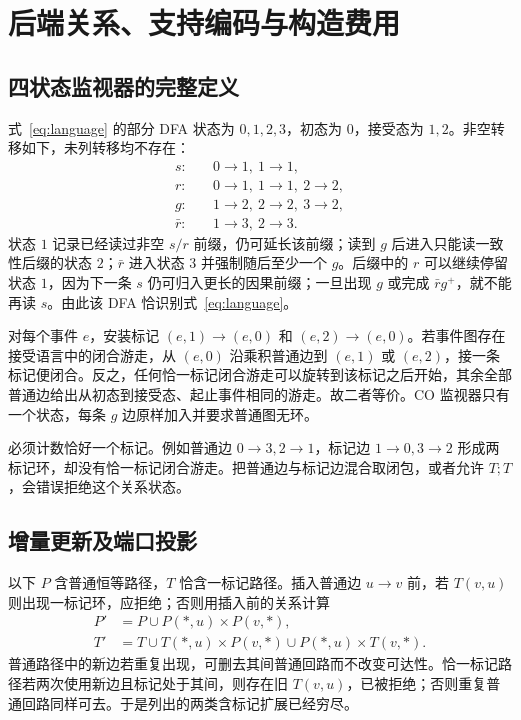 \section{后端关系、支持编码与构造费用}
\subsection{四状态监视器的完整定义}\label{app:automaton}
式~\eqref{eq:language} 的部分 DFA 状态为 $0,1,2,3$，初态为 $0$，接受态为 $1,2$。非空转移如下，未列转移均不存在：
\begin{align*}
 s:&\quad 0\to1,\ 1\to1,\\
 r:&\quad 0\to1,\ 1\to1,\ 2\to2,\\
 g:&\quad 1\to2,\ 2\to2,\ 3\to2,\\
 \bar r:&\quad 1\to3,\ 2\to3.
\end{align*}
状态 $1$ 记录已经读过非空 $s/r$ 前缀，仍可延长该前缀；读到 $g$ 后进入只能读一致性后缀的状态 $2$；$\bar r$ 进入状态 $3$ 并强制随后至少一个 $g$。后缀中的 $r$ 可以继续停留状态 $1$，因为下一条 $s$ 仍可归入更长的因果前缀；一旦出现 $g$ 或完成 $\bar r g^+$，就不能再读 $s$。由此该 DFA 恰识别式~\eqref{eq:language}。

对每个事件 $e$，安装标记 $(e,1)\to(e,0)$ 和 $(e,2)\to(e,0)$。若事件图存在接受语言中的闭合游走，从 $(e,0)$ 沿乘积普通边到 $(e,1)$ 或 $(e,2)$，接一条标记便闭合。反之，任何恰一标记闭合游走可以旋转到该标记之后开始，其余全部普通边给出从初态到接受态、起止事件相同的游走。故二者等价。CO 监视器只有一个状态，每条 $g$ 边原样加入并要求普通图无环。

必须计数恰好一个标记。例如普通边 $0\to3,2\to1$，标记边 $1\to0,3\to2$ 形成两标记环，却没有恰一标记闭合游走。把普通边与标记边混合取闭包，或者允许 $T;T$，会错误拒绝这个关系状态。

\subsection{增量更新及端口投影}\label{app:update}
以下 $P$ 含普通恒等路径，$T$ 恰含一标记路径。插入普通边 $u\to v$ 前，若 $T(v,u)$ 则出现一标记环，应拒绝；否则用插入前的关系计算
\begin{align}
 P'&=P\cup P(*,u)\times P(v,*),\label{eq:updateP}\\
 T'&=T\cup T(*,u)\times P(v,*)\cup P(*,u)\times T(v,*).\label{eq:updateT}
\end{align}
普通路径中的新边若重复出现，可删去其间普通回路而不改变可达性。恰一标记路径若两次使用新边且标记处于其间，则存在旧 $T(v,u)$，已被拒绝；否则重复普通回路同样可去。于是列出的两类含标记扩展已经穷尽。

